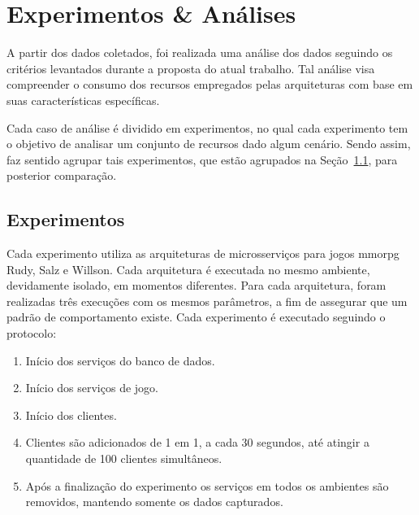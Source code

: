 \chapter{Experimentos \& Análises}
\label{cap6}



A partir dos dados coletados, foi realizada uma análise dos dados seguindo os critérios levantados durante a proposta do atual trabalho.
%
Tal análise visa compreender o consumo dos recursos empregados pelas arquiteturas com base em suas características específicas.



Cada caso de análise é dividido em experimentos, no qual cada experimento tem o objetivo de analisar um conjunto de recursos dado algum cenário.
%
Sendo assim, faz sentido agrupar tais experimentos, que estão agrupados na Seção~\ref{sec:experimentos}, para posterior comparação. %





\section{Experimentos}
\label{sec:experimentos}

Cada experimento utiliza as arquiteturas de microsserviços para jogos \ac{mmorpg} Rudy, Salz e Willson.
%
Cada arquitetura é executada no mesmo ambiente, devidamente isolado, em momentos diferentes.
%
Para cada arquitetura, foram realizadas três execuções com os mesmos parâmetros, a fim de assegurar que um padrão de comportamento existe.
%
Cada  experimento é executado seguindo o protocolo:


\begin{enumerate}
 \item Início dos serviços do banco de dados.
 \item Início dos serviços de jogo.
 \item Início dos clientes.
 \item Clientes são adicionados de 1 em 1, a cada 30 segundos, até atingir a quantidade de 100 clientes simultâneos.
 \item Após a finalização do experimento os serviços em todos os ambientes são removidos, mantendo somente os dados capturados.
\end{enumerate}


